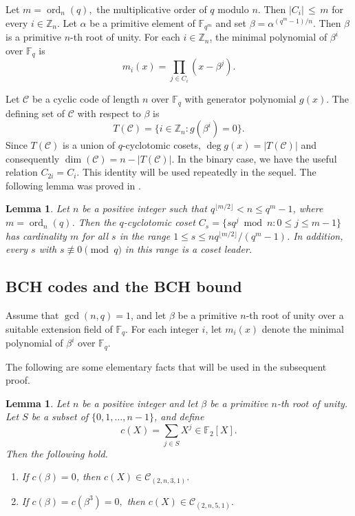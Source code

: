\documentclass[12pt,draftcls,journal,onecolumn]{IEEEtran}
\newtheorem{lemma}[theorem]{Lemma}
\begin{document}
Let
$
m=\operatorname{ord}_n(q),
$
the multiplicative order of $q$ modulo $n$. Then
$
|C_i|\, \leq\, m
$
for every $i\in\mathbb{Z}_n$.
Let $\alpha$ be a primitive element of $\mathbb{F}_{q^m}$ and set
$
\beta=\alpha^{(q^m-1)/n}.
$
Then $\beta$ is a primitive $n$-th root of unity. For each
$i\in\mathbb{Z}_n$, the minimal polynomial of $\beta^i$ over
$\mathbb{F}_q$ is
\[
m_i(x)=\prod_{j\in C_i}(x-\beta^j).
\]

Let $\mathcal{C}$ be a cyclic code of length $n$ over $\mathbb{F}_q$ with
generator polynomial $g(x)$. The defining set of $\mathcal{C}$ with respect to
$\beta$ is
\[
T(\mathcal{C})=\{i\in\mathbb{Z}_n:g(\beta^i)=0\}.
\]
Since $T(\mathcal{C})$ is a union of $q$-cyclotomic cosets,
$
\deg g(x)=|T(\mathcal{C})|
$
and consequently
$
\dim(\mathcal{C})=n-|T(\mathcal{C})|.
$
In the binary case, we have the useful relation
$
C_{2i}=C_i.
$
This identity will be used repeatedly in the sequel. The following lemma was proved in \cite{Aly07}.
 \begin{lemma}\cite{Aly07}\label{ewnd}
Let \( n \) be a positive integer such that \( q^{\lfloor m/2 \rfloor} < n \leq q^m - 1 \), where \( m = \operatorname{ord}_n(q) \).
Then the \( q \)-cyclotomic coset \( C_s = \{sq^j \bmod n : 0 \leq j \leq m-1\} \) has cardinality \( m \) for all \( s \) in the range \( 1 \leq s \leq nq^{\lfloor m/2 \rfloor}/(q^m - 1) \). In addition, every \( s \) with \( s \not\equiv 0 \pmod{q} \) in this range is a coset leader.
\end{lemma}


\subsection{BCH codes and the BCH bound}

Assume that $\gcd(n,q)=1$, and let $\beta$ be a primitive
$n$-th root of unity over a suitable extension field of $\mathbb{F}_q$.
For each integer $i$, let $m_i(x)$ denote the minimal polynomial of
$\beta^i$ over $\mathbb{F}_q$.


The following are some elementary facts that will be used in the subsequent proof.

\begin{lemma}\label{lem:rootcriterion}
Let $n$ be a positive integer and let $\beta$
be a primitive $n$-th root of unity. Let \(S\) be a subset of \(\{0,1,\ldots,n-1\}\), and define
\[
c(X)=\sum_{j\in S}X^j\in\mathbb F_2[X].
\]
Then the following hold.
\begin{enumerate}
\item If $c(\beta)=0$, then
$
c(X)\in \mathcal{C}_{(2,n,3,1)}.
$

\item If
$
c(\beta)=c(\beta^3)=0,
$
then
$
c(X)\in \mathcal{C}_{(2,n,5,1)}.
$
\end{enumerate}
\end{lemma}
\end{document}

